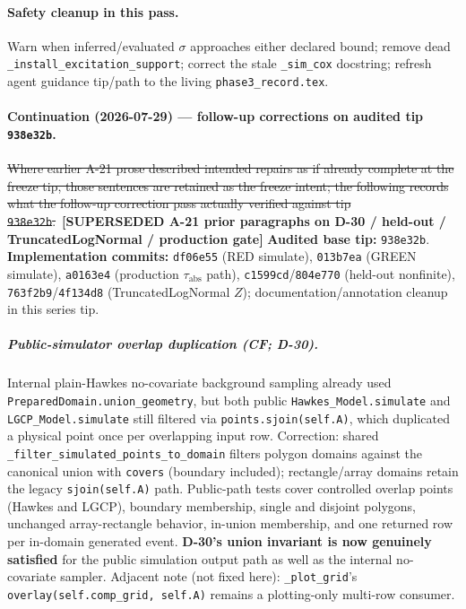 \documentclass[
  10pt,
]{article}
\newcommand{\amdstrike}[1]{\sout{#1}}
\newcommand{\amdstrike}[1]{\textcolor{supcolor}{#1}}
\newcommand{\supsd}[2]{{\color{supcolor}\amdstrike{#2}}~{\color{amdcolor}\footnotesize\textbf{[SUPERSEDED #1]}}}
\begin{document}
\paragraph{Safety cleanup in this pass.}
Warn when inferred/evaluated \(\sigma\) approaches either declared bound; remove dead \texttt{\_install\_excitation\_support}; correct the stale \texttt{\_sim\_cox} docstring; refresh agent guidance tip/path to the living \texttt{phase3\_record.tex}.

\paragraph{Continuation (2026-07-29) --- follow-up corrections on audited tip \texttt{938e32b}.}
\supsd{A-21 prior paragraphs on D-30 / held-out / TruncatedLogNormal / production gate}{Where earlier A-21 prose described intended repairs as if already complete at the freeze tip, those sentences are retained as the freeze intent; the following records what the follow-up correction pass actually verified against tip \texttt{938e32b}.}
\textbf{Audited base tip:} \texttt{938e32b}. \textbf{Implementation commits:} \texttt{df06e55} (RED simulate), \texttt{013b7ea} (GREEN simulate), \texttt{a0163e4} (production \(\tau_{\mathrm{abs}}\) path), \texttt{c1599cd}/\texttt{804e770} (held-out nonfinite), \texttt{763f2b9}/\texttt{4f134d8} (TruncatedLogNormal \(Z\)); documentation/annotation cleanup in this series tip.

\subparagraph{Public-simulator overlap duplication (CF; D-30).}
Internal plain-Hawkes no-covariate background sampling already used \texttt{PreparedDomain.union\_geometry}, but both public \texttt{Hawkes\_Model.simulate} and \texttt{LGCP\_Model.simulate} still filtered via \texttt{points.sjoin(self.A)}, which duplicated a physical point once per overlapping input row.
Correction: shared \texttt{\_filter\_simulated\_points\_to\_domain} filters polygon domains against the canonical union with \texttt{covers} (boundary included); rectangle/array domains retain the legacy \texttt{sjoin(self.A)} path.
Public-path tests cover controlled overlap points (Hawkes and LGCP), boundary membership, single and disjoint polygons, unchanged array-rectangle behavior, in-union membership, and one returned row per in-domain generated event.
\textbf{D-30's union invariant is now genuinely satisfied} for the public simulation output path as well as the internal no-covariate sampler.
Adjacent note (not fixed here): \texttt{\_plot\_grid}'s \texttt{overlay(self.comp\_grid, self.A)} remains a plotting-only multi-row consumer.
\end{document}
